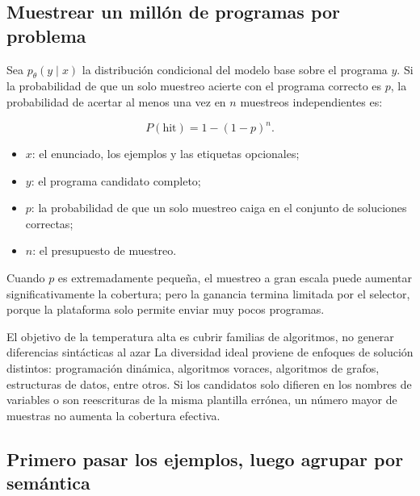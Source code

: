 \documentclass[a4paper]{article}
\begin{document}
\subsection{Muestrear un millón de programas por problema}


Sea $p_\theta(y\mid x)$ la distribución condicional del modelo base sobre el programa $y$. Si la probabilidad de que un solo muestreo acierte con el programa correcto es $p$, la probabilidad de acertar al menos una vez en $n$ muestreos independientes es:

$$
P(\text{hit})=1-(1-p)^n.
$$

\begin{itemize}
    \item $x$: el enunciado, los ejemplos y las etiquetas opcionales;
    \item $y$: el programa candidato completo;
    \item $p$: la probabilidad de que un solo muestreo caiga en el conjunto de soluciones correctas;
    \item $n$: el presupuesto de muestreo.
\end{itemize}

Cuando $p$ es extremadamente pequeña, el muestreo a gran escala puede aumentar significativamente la cobertura; pero la ganancia termina limitada por el selector, porque la plataforma solo permite enviar muy pocos programas.

\begin{importantbox}{El objetivo de la temperatura alta es cubrir familias de algoritmos, no generar diferencias sintácticas al azar}
La diversidad ideal proviene de enfoques de solución distintos: programación dinámica, algoritmos voraces, algoritmos de grafos, estructuras de datos, entre otros. Si los candidatos solo difieren en los nombres de variables o son reescrituras de la misma plantilla errónea, un número mayor de muestras no aumenta la cobertura efectiva.
\end{importantbox}

\subsection{Primero pasar los ejemplos, luego agrupar por semántica}
\end{document}
